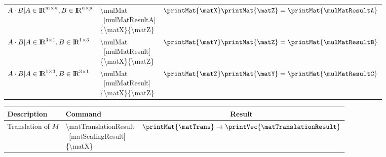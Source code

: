 \documentclass[10pt, a4paper]{article}
\begin{document}
\begin{center}
\begin{tabular}{ l l c }
        \(A \cdot B | A \in \textrm{I\!R}^{m\times n}, B \in \textrm{I\!R}^{n\times p}\) & \makecell[l]{\textbackslash mulMat\\\ [mulMatResultA]\\\{\textbackslash matX\}\{\textbackslash matZ\}} & \(\printMat{\matX} \printMat{\matZ} = \printMat{\mulMatResultA}\)\\
        \(A \cdot B | A \in \textrm{I\!R}^{3\times 1}, B \in \textrm{I\!R}^{1\times 3}\) & \makecell[l]{\textbackslash mulMat\\\ [mulMatResult]\\\{\textbackslash matX\}\{\textbackslash matZ\}} & \(\printMat{\matY} \printMat{\matZ} = \printMat{\mulMatResultB}\)\\
        \(A \cdot B | A \in \textrm{I\!R}^{1\times 3}, B \in \textrm{I\!R}^{3\times 1}\) & \makecell[l]{\textbackslash mulMat\\\ [mulMatResult]\\\{\textbackslash matX\}\{\textbackslash matZ\}} & \(\printMat{\matZ} \printMat{\matY} = \printMat{\mulMatResultC}\)\\
    \end{tabular}
\end{center}

\getMatTranslation{\matTrans}

\begin{center}
    \begin{tabular}{ l l c }
        Description & Command & Result\\ \hline
        Translation of \(M\) & \makecell[l]{\textbackslash matTranslationResult\\\ [matScalingResult]\\\{\textbackslash matX\}} & \(\printMat{\matTrans} \xrightarrow{} \printVec{\matTranslationResult}\)\\
    \end{tabular}
\end{center}
\end{document}
